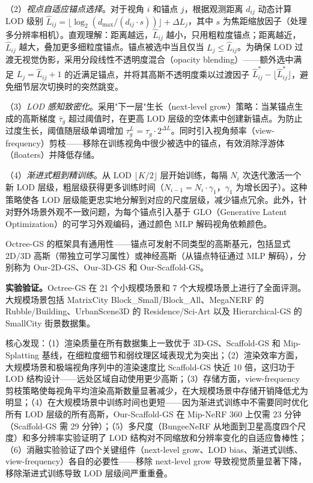 （2）\textit{视点自适应锚点选择}。对于视角 $i$ 和锚点 $j$，根据观测距离 $d_{ij}$ 动态计算 LOD 级别 $\hat{L}_{ij} = \lfloor\log_2(d_{\max}/(d_{ij} \cdot s))\rfloor + \Delta L_j$，其中 $s$ 为焦距缩放因子（处理多分辨率相机）。直观理解：距离越远，$\hat{L}_{ij}$ 越小，只用粗粒度锚点；距离越近，$\hat{L}_{ij}$ 越大，叠加更多细粒度锚点。锚点被选中当且仅当 $L_j \leq \hat{L}_{ij}$。为确保 LOD 过渡无视觉伪影，采用分段线性不透明度混合（opacity blending）——额外选中满足 $L_j = \hat{L}_{ij} + 1$ 的近满足锚点，并将其高斯不透明度乘以过渡因子 $\hat{L}_{ij}^* - \lfloor\hat{L}_{ij}^*\rfloor$，避免细节层次切换时的突然跳变。

（3）\textit{LOD 感知致密化}。采用"下一层"生长（next-level grow）策略：当某锚点生成的高斯梯度 $\bar{\tau}_g$ 超过阈值时，在更高 LOD 层级的空体素中创建新锚点。为防止过度生长，阈值随层级单调增加 $\tau_g^L = \tau_g \cdot 2^{\Delta L}$。同时引入视角频率（view-frequency）剪枝——移除在训练视角中很少被选中的锚点，有效消除浮游体（floaters）并降低存储。

（4）\textit{渐进式粗到精训练}。从 LOD $\lfloor K/2 \rfloor$ 层开始训练，每隔 $N_i$ 次迭代激活一个新 LOD 层级，粗层级获得更多训练时间（$N_{i-1} = N_i \cdot \gamma_1$，$\gamma_1$ 为增长因子）。这种策略使各 LOD 层级能更忠实地分解到对应的尺度层级，减少锚点冗余。此外，针对野外场景外观不一致问题，为每个锚点引入基于 GLO（Generative Latent Optimization）的可学习外观编码，通过颜色 MLP 解码视角依赖颜色。

Octree-GS 的框架具有通用性——锚点可发射不同类型的高斯基元，包括显式 2D/3D 高斯（带独立可学习属性）或神经高斯（从锚点特征通过 MLP 解码），分别称为 Our-2D-GS、Our-3D-GS 和 Our-Scaffold-GS。

\textbf{实验验证。}Octree-GS 在 21 个小规模场景和 7 个大规模场景上进行了全面评测。大规模场景包括 MatrixCity Block\_Small/Block\_All、MegaNERF 的 Rubble/Building、UrbanScene3D 的 Residence/Sci-Art 以及 Hierarchical-GS 的 SmallCity 街景数据集。

核心发现：（1）渲染质量在所有数据集上一致优于 3D-GS、Scaffold-GS 和 Mip-Splatting 基线，在细粒度细节和弱纹理区域表现尤为突出；（2）渲染效率方面，大规模场景和极端视角序列中的渲染速度比 Scaffold-GS 快近 10 倍，这归功于 LOD 结构设计——远处区域自动使用更少高斯；（3）存储方面，view-frequency 剪枝策略使每视角平均渲染高斯数量显著减少，在大规模场景中存储开销降低尤为明显；（4）在大规模场景中训练时间也更短——因为渐进式训练中不需要同时优化所有 LOD 层级的所有高斯，Our-Scaffold-GS 在 Mip-NeRF 360 上仅需 23 分钟（Scaffold-GS 需 29 分钟）；（5）多尺度（BungeeNeRF 从地面到卫星高度四个尺度）和多分辨率实验证明了 LOD 结构对不同缩放和分辨率变化的自适应鲁棒性；（6）消融实验验证了四个关键组件（next-level grow、LOD bias、渐进式训练、view-frequency）各自的必要性——移除 next-level grow 导致视觉质量显著下降，移除渐进式训练导致 LOD 层级间严重重叠。

